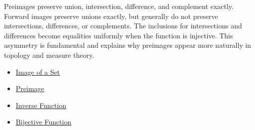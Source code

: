 \begin{remark*}[Exposition]
Preimages preserve union, intersection, difference, and complement exactly.
Forward images preserve unions exactly, but generally do not preserve
intersections, differences, or complements. The inclusions for intersections
and differences become equalities uniformly when the function is injective.
This asymmetry is fundamental and explains why preimages appear more naturally
in topology and measure theory.
\end{remark*}

\begin{dependencies}
\begin{itemize}
  \item \hyperref[def:image-set]{Image of a Set}
  \item \hyperref[def:preimage]{Preimage}
  \item \hyperref[def:inverse]{Inverse Function}
  \item \hyperref[def:bijective]{Bijective Function}
\end{itemize}
\end{dependencies}

